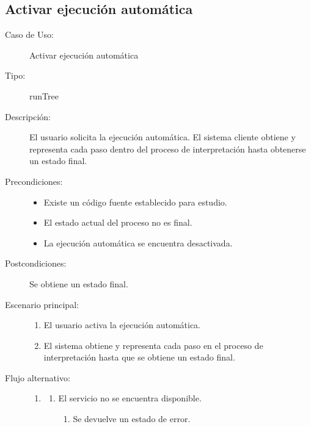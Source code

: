 \subsection{Activar ejecución automática} 
\begin{framed}
\FloatBarrier
\begin{description}
   \item[Caso de Uso:] Activar ejecución automática
   \item [Tipo:] runTree
   \item[Descripción:] 
   El usuario solicita la ejecución automática. 
   El sistema cliente obtiene y representa cada paso dentro del proceso 
   de interpretación hasta obtenerse un estado final.
   \item[Precondiciones:] \hfill 
   \begin{itemize}
   \item Existe un código fuente establecido para estudio. 
   \item El estado actual del proceso no es final.
   \item La ejecución automática se encuentra desactivada. 
   \end{itemize}
   \item[Postcondiciones:] 
   Se obtiene un estado final.
   \item[Escenario principal:] \hfill
   \begin{enumerate}
   \item El usuario activa la ejecución automática.
   \item El sistema obtiene y representa cada paso en el proceso de interpretación hasta que se 
   obtiene un estado final.
   \end{enumerate}
   \item[Flujo alternativo:] \hfill 
   \begin{enumerate} \itemsep1pt \parskip0pt 
   \setcounter{enumi}{1}
   \renewcommand{\labelenumi}{}
   \renewcommand{\labelenumiii}{\arabic{enumiii}.}
   \renewcommand{\labelenumii}{\arabic{enumi}\alph{enumii}.}
      \item 
      \begin {enumerate}
         \setcounter{enumii}{0}
         \item El servicio no se encuentra disponible.
         \begin{enumerate}
         \item Se devuelve un estado de error.
         \end{enumerate}
      \end{enumerate}
   \end{enumerate}
\end{description}
 \FloatBarrier
\end{framed}

